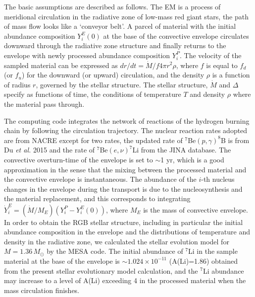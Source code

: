 \documentclass[twoside,onecolumnm,12pt]{article}
\newcommand{\upcite}[1]{\textsuperscript{\textsuperscript{\cite{#1}}}}
\begin{document}
The basic assumptions are described as follows. The EM is a process of meridional circulation in the radiative zone of low-mass red giant stars, the path of mass flow looks like a `conveyor belt'. A parcel of material with the initial abundance composition $Y^E_i(0)$ at the base of the convective envelope circulates downward through the radiative zone structure and finally returns to the envelope with newly processed abundance composition $Y^P_i$. The velocity of the sampled material can be expressed as $dr/dt=\dot{M}/f4\pi r^2\rho$, where $f$ is equal to $f_d$ (or $f_u$) for the downward (or upward) circulation, and the density $\rho$ is a function of radius $r$, governed by the stellar structure. The stellar structure, $\dot{M}$ and $\Delta$ specify as functions of time, the conditions of temperature $T$ and density $\rho$ where the material pass through.

The computing code integrates the network of reactions of the hydrogen burning chain by following the circulation trajectory. The nuclear reaction rates adopted are from NACRE \upcite{Angulo1999} except for two rates, the updated rate of $^7$Be$(p,\gamma)^8$B is from Du \emph{et al.} 2015 \upcite{Du2015} and the rate of $^7$Be$(e,\nu)^7$Li from the JINA database. The convective overturn-time of the envelope is set to $\sim$1 yr, which is a good approximation in the sense that the mixing between the processed material and the convective envelope is instantaneous. The abundance of the $i$-th nucleus changes in the envelope during the transport is due to the nucleosynthesis and the material replacement, and this corresponds to integrating $\dot{Y}^E_i=(\dot{M}/M_E)(Y^P_i-Y^E_i(0))$\upcite{Nollett2003}, where $M_E$ is the mass of convective envelope. In order to obtain the RGB stellar structure, including in particular the initial abundance composition in the envelope and the distributions of temperature and density in the radiative zone, we calculated the stellar evolution model for $M=1.36\,M_{\odot}$ by the MESA code. The initial abundance of $^7$Li in the sample material at the base of the envelope is $\sim 1.024\times 10^{-11}$ (A(Li)=1.86) obtained from the present stellar evolutionary model calculation, and the $^7$Li abundance may increase to a level of A(Li) exceeding 4 in the processed material when the mass circulation finishes.
\end{document}
